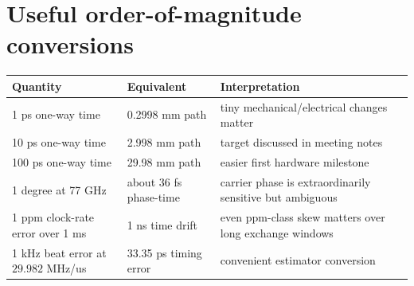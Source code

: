 \documentclass[11pt]{article}
\begin{document}
\section{Useful order-of-magnitude conversions}
\begin{longtable}{p{}p{}p{}}
\toprule Quantity & Equivalent & Interpretation \\ \midrule
1 ps one-way time & 0.2998 mm path & tiny mechanical/electrical changes matter \\
10 ps one-way time & 2.998 mm path & target discussed in meeting notes \\
100 ps one-way time & 29.98 mm path & easier first hardware milestone \\
1 degree at 77 GHz & about 36 fs phase-time & carrier phase is extraordinarily sensitive but ambiguous \\
1 ppm clock-rate error over 1 ms & 1 ns time drift & even ppm-class skew matters over long exchange windows \\
1 kHz beat error at $29.982$ MHz/us & 33.35 ps timing error & convenient estimator conversion \\
\bottomrule
\end{longtable}
\end{document}

